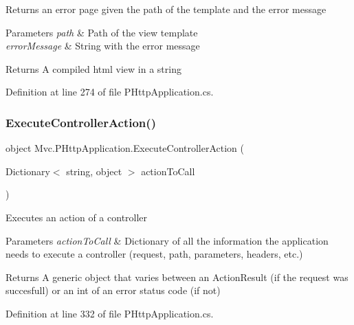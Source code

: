 Returns an error page given the path of the template and the error message 


\begin{DoxyParams}{Parameters}
{\em path} & Path of the view template\\
\hline
{\em error\+Message} & String with the error message\\
\hline
\end{DoxyParams}
\begin{DoxyReturn}{Returns}
A compiled html view in a string
\end{DoxyReturn}


Definition at line 274 of file P\+Http\+Application.\+cs.

\mbox{\label{class_mvc_1_1_p_http_application_a4de3706c2afcbfb56c98a7ca820f53a7}} 
\subsubsection{\texorpdfstring{Execute\+Controller\+Action()}{ExecuteControllerAction()}}
{\footnotesize\ttfamily object Mvc.\+P\+Http\+Application.\+Execute\+Controller\+Action (\begin{DoxyParamCaption}\item[{Dictionary$<$ string, object $>$}]{action\+To\+Call }\end{DoxyParamCaption})}



Executes an action of a controller 


\begin{DoxyParams}{Parameters}
{\em action\+To\+Call} & Dictionary of all the information the application needs to execute a controller (request, path, parameters, headers, etc.)\\
\hline
\end{DoxyParams}
\begin{DoxyReturn}{Returns}
A generic object that varies between an Action\+Result (if the request was succesfull) or an int of an error status code (if not)
\end{DoxyReturn}


Definition at line 332 of file P\+Http\+Application.\+cs.

